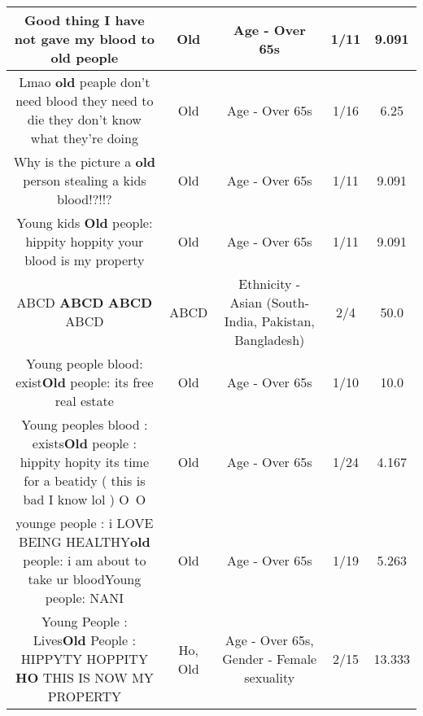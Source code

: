\documentclass[11pt]{article}
\newlength\mylength
\begin{document}
\begin{center}
\begin{longtable}{|C{.65\mylength}|C{.30\mylength}|C{.12\mylength}|C{.12\mylength}|C{.12\mylength}|}
  \small Good thing I have not gave my blood to \textbf{old} people\normalsize   & Old & Age - Over 65s & 1/11 & 9.091 \\  \hline
  \small Lmao \textbf{old} peaple don't need blood they need to die they don't know what they're doing\normalsize   & Old & Age - Over 65s & 1/16 & 6.25 \\  \hline
  \small Why is the picture a \textbf{old} person stealing a kids blood!?!!?\normalsize   & Old & Age - Over 65s & 1/11 & 9.091 \\  \hline
  \small Young kids \textbf{Old} people: hippity hoppity your blood is my property\normalsize   & Old & Age - Over 65s & 1/11 & 9.091 \\  \hline
  \small ABCD \textbf{ABCD} \textbf{ABCD} ABCD\normalsize   & ABCD & Ethnicity - Asian (South- India, Pakistan, Bangladesh) & 2/4 & 50.0 \\  \hline
  \small Young people blood: exist\textbf{Old} people: its free real estate\normalsize   & Old & Age - Over 65s & 1/10 & 10.0 \\  \hline
  \small Young peoples blood : exists\textbf{Old} people : hippity hopity its time for a beatidy ( this is bad I know lol ) O~O\normalsize   & Old & Age - Over 65s & 1/24 & 4.167 \\  \hline
  \small younge people : i LOVE BEING HEALTHY\textbf{old} people: i am about to take ur bloodYoung people: NANI\normalsize   & Old & Age - Over 65s & 1/19 & 5.263 \\  \hline
  \small Young People : Lives\textbf{Old} People : HIPPYTY HOPPITY \textbf{HO} THIS IS NOW MY PROPERTY\normalsize   & Ho, Old & Age - Over 65s, Gender - Female sexuality & 2/15 & 13.333 \\  \hline

\end{longtable}
\end{center}
\end{document}
